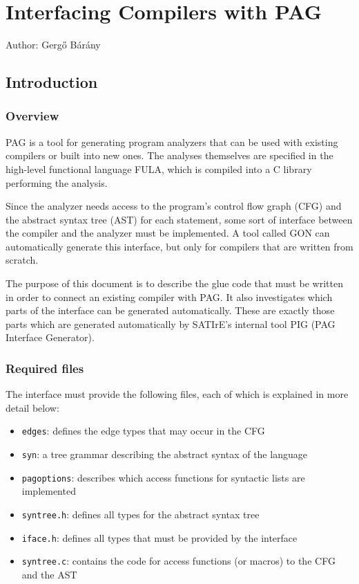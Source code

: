\chapter{Interfacing Compilers with PAG}

Author: Gerg\H{o} B\'ar\'any


\section{Introduction}
\subsection{Overview}

PAG is a tool for generating program analyzers that can be used with
existing compilers or built into new ones. The analyses themselves
are specified in the high-level functional language FULA, which is
compiled into a C library performing the analysis.

Since the analyzer needs access to the program's control flow graph
(CFG) and the abstract syntax tree (AST) for each statement, some
sort of interface between the compiler and the analyzer must be
implemented. A tool called GON can automatically generate this
interface, but only for compilers that are written from scratch.

The purpose of this document is to describe the glue code that must be
written in order to connect an existing compiler with PAG. It also
investigates which parts of the interface can be generated
automatically. These are exactly those parts which are generated
automatically by SATIrE's internal tool PIG (PAG Interface Generator).

\subsection{Required files}

The interface must provide the following files, each of which is
explained in more detail below:
\begin{itemize}
\item \verb|edges|: defines the edge types that may occur in the CFG
\item \verb|syn|: a tree grammar describing the abstract syntax of
the language
\item \verb|pagoptions|: describes which access functions for
syntactic lists are implemented
\item \verb|syntree.h|: defines all types for the abstract syntax
tree
\item \verb|iface.h|: defines all types that must be provided by the
interface
\item \verb|syntree.c|: contains the code for access functions (or
macros) to the CFG and the AST
\end{itemize}

